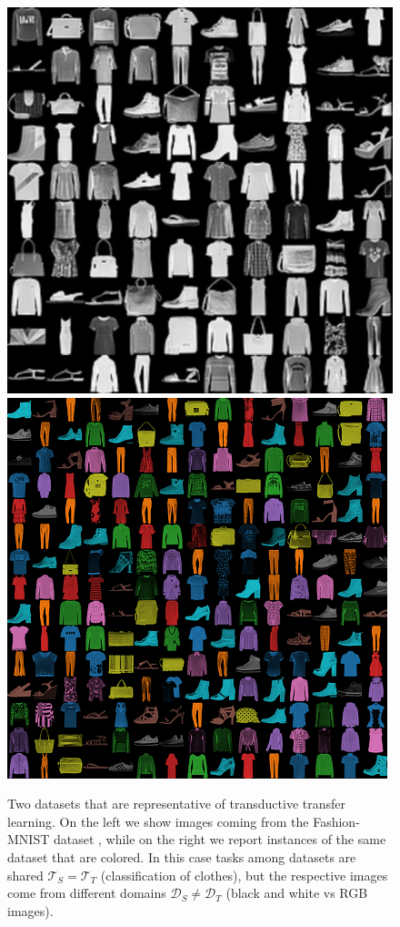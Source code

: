 \begin{figure}
    \includegraphics[width=\linewidth]{./Images/Chapter03/fashion_mnist}
  \endminipage\hfill
    \includegraphics[width=\linewidth]{./Images/Chapter03/colorful_fashion_mnist}
  \endminipage\hfill
  \caption{Two datasets that are representative of transductive transfer learning. On the left we show images coming from the Fashion-MNIST dataset \cite{xiao2017fashion}, while on the right we report instances of the same dataset that are colored. In this case tasks among datasets are shared $\mathcal{T}_S = \mathcal{T}_T$ (classification of clothes), but the respective images come from different domains $\mathcal{D}_S \neq \mathcal{D}_T$ (black and white vs RGB images).}
  \label{fig:transductive_tl}
\end{figure}


